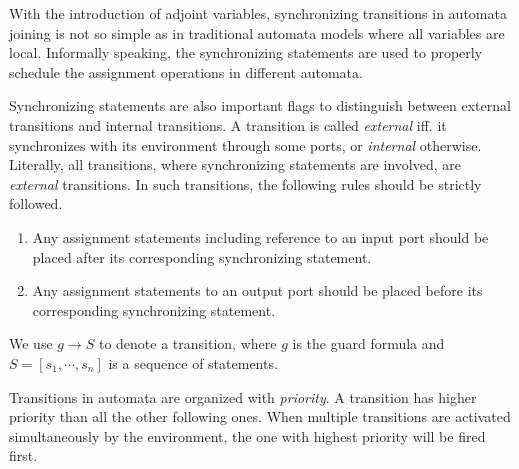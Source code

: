With the introduction of adjoint variables, synchronizing transitions in automata joining is not so simple as in traditional automata models where all variables are local. Informally speaking, the synchronizing statements are used to properly schedule the assignment operations in different automata.

Synchronizing statements are also important flags to distinguish between external transitions and internal transitions. A transition is called \emph{external} iff. it synchronizes with its environment through some ports, or \emph{internal} otherwise. Literally, all transitions, where synchronizing statements are involved, are \emph{external} transitions. In such transitions, the following rules should be strictly followed.

\begin{enumerate}
    \item Any assignment statements including reference to an input port should be placed after its corresponding synchronizing statement.
    \item Any assignment statements to an output port should be placed before its corresponding synchronizing statement.
\end{enumerate}


We use $g\rightarrow S$ to denote a transition, where $g$ is the guard formula and $S=[s_1,\cdots,s_n]$ is a sequence of statements. 

Transitions in \lang{} automata are organized with \emph{priority}. A transition has higher priority than all the other following ones. When multiple transitions are activated simultaneously by the environment, the one with highest priority will be fired first. 

